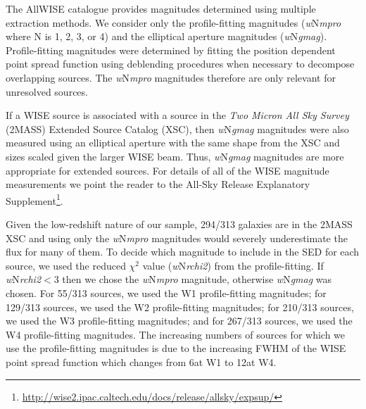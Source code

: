 \documentclass[fleqn, usenatbib]{mnras}
\begin{document}
The AllWISE catalogue provides magnitudes determined using multiple extraction methods. We consider only the profile-fitting magnitudes (\textit{w}N\textit{mpro} where N is 1, 2, 3, or 4) and the elliptical aperture magnitudes (\textit{w}N\textit{gmag}). Profile-fitting magnitudes were determined by fitting the position dependent point spread function using deblending procedures when necessary to decompose overlapping sources. The \textit{w}N\textit{mpro} magnitudes therefore are only relevant for unresolved sources.

If a WISE source is associated with a source in the \textit{Two Micron All Sky Survey} (2MASS) Extended Source Catalog (XSC), then \textit{w}N\textit{gmag} magnitudes were also measured using an elliptical aperture with the same shape from the XSC and sizes scaled given the larger WISE beam. Thus, \textit{w}N\textit{gmag} magnitudes are more appropriate for extended sources. For details of all of the WISE magnitude measurements we point the reader to the All-Sky Release Explanatory Supplement\footnote{\url{http://wise2.ipac.caltech.edu/docs/release/allsky/expsup/}}.

Given the low-redshift nature of our sample, 294/313 galaxies are in the 2MASS XSC and using only the \textit{w}N\textit{mpro} magnitudes would severely underestimate the flux for many of them. To decide which magnitude to include in the SED for each source, we used the reduced $\chi^{2}$ value (\textit{w}N\textit{rchi2}) from the profile-fitting. If \textit{w}N\textit{rchi2}$<3$ then we chose the \textit{w}N\textit{mpro} magnitude, otherwise \textit{w}N\textit{gmag} was chosen. For 55/313 sources, we used the W1 profile-fitting magnitudes; for 129/313 sources, we used the W2 profile-fitting magnitudes; for 210/313 sources, we used the W3 profile-fitting magnitudes; and for 267/313 sources, we used the W4 profile-fitting magnitudes. The increasing numbers of sources for which we use the profile-fitting magnitudes is due to the increasing FWHM of the WISE point spread function which changes from 6\arcsec at W1 to 12\arcsec at W4.
\end{document}
